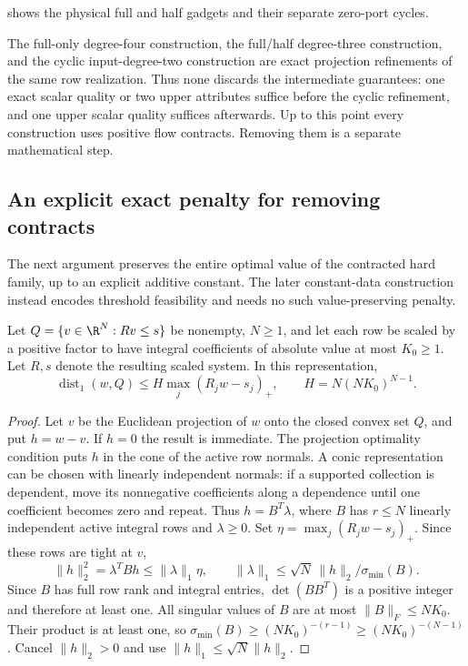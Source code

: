  shows the physical full and half gadgets and
their separate zero-port cycles.


The full-only degree-four construction, the full/half degree-three
construction, and the cyclic input-degree-two construction are exact
projection refinements of the same row realization. Thus none discards
the intermediate guarantees: one exact scalar quality or two upper
attributes suffice before the cyclic refinement, and one upper scalar
quality suffices afterwards. Up to this point every construction uses
positive flow contracts. Removing them is a separate mathematical step.

\subsection{An explicit exact penalty for removing contracts}\label{s3:penalty}

The next argument preserves the entire optimal value of the contracted
hard family, up to an explicit additive constant. The later constant-data
construction instead encodes threshold feasibility and needs no such
value-preserving penalty.

\begin{lemma}\label{s3:hoffman}
Let $Q=\{v\in\R^N:Rv\le s\}$ be nonempty, $N\ge1$, and let each row
be scaled by a positive factor to have integral coefficients of absolute
value at most $K_0\ge1$. Let $R,s$ denote the resulting scaled system. In this representation,
\begin{equation}
 \operatorname{dist}_1(w,Q)\le H\max_j(R_jw-s_j)_+,
 \qquad H=N(NK_0)^{N-1}.\label{s3:hoffman-bound}
\end{equation}
\end{lemma}
\begin{proof}
Let $v$ be the Euclidean projection of $w$ onto the closed convex set
$Q$, and put $h=w-v$. If $h=0$ the result is immediate. The projection
optimality condition puts $h$ in the cone of the active row normals.
A conic representation can be chosen with linearly independent normals:
if a supported collection is dependent, move its nonnegative coefficients
along a dependence until one coefficient becomes zero and repeat. Thus
$h=B^T\lambda$, where $B$ has $r\le N$ linearly independent active
integral rows and $\lambda\ge0$. Set
$\eta=\max_j(R_jw-s_j)_+$. Since these rows are tight at $v$,
\[
 \|h\|_2^2=\lambda^TBh\le\|\lambda\|_1\eta,
 \qquad
 \|\lambda\|_1\le\sqrt N\,\|h\|_2/\sigma_{\min}(B).
\]
Since $B$ has full row rank and integral entries, $\det(BB^T)$ is
a positive integer and therefore at least one. All singular values
of $B$ are at most $\|B\|_F\le NK_0$. Their product is at least one,
so $\sigma_{\min}(B)\ge(NK_0)^{-(r-1)}\ge(NK_0)^{-(N-1)}$.
Cancel $\|h\|_2>0$ and use $\|h\|_1\le\sqrt N\|h\|_2$.
\end{proof}

